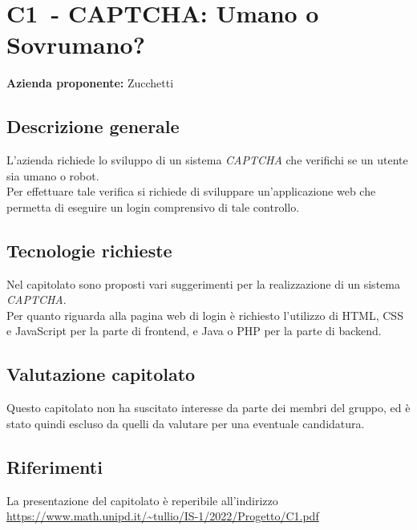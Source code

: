 
\renewcommand{\capName}{CAPTCHA: Umano o Sovrumano?} %
\renewcommand{\capCode}{C1} %
\renewcommand{\capLink}{https://www.math.unipd.it/~tullio/IS-1/2022/Progetto/C1.pdf} %
\renewcommand{\capProposer}{Zucchetti} %


\section{\capCode\ - \capName}
\textbf{Azienda proponente:} Zucchetti
\subsection{Descrizione generale}
L'azienda richiede lo sviluppo di un sistema \emph{CAPTCHA} che verifichi se un utente sia umano o robot. \\
Per effettuare tale verifica si richiede di sviluppare un'applicazione web che permetta di eseguire un login comprensivo di tale controllo.

\subsection{Tecnologie richieste}
Nel capitolato sono proposti vari suggerimenti per la realizzazione di un sistema \emph{CAPTCHA}. \\
Per quanto riguarda alla pagina web di login è richiesto l'utilizzo di HTML, CSS e JavaScript per la parte di frontend, e Java o PHP per la parte di backend.

\subsection{Valutazione capitolato}
Questo capitolato non ha suscitato interesse da parte dei membri del gruppo, ed è stato quindi escluso da quelli da valutare per una eventuale candidatura.

\subsection{Riferimenti}
La presentazione del capitolato è reperibile all'indirizzo \url{\capLink}